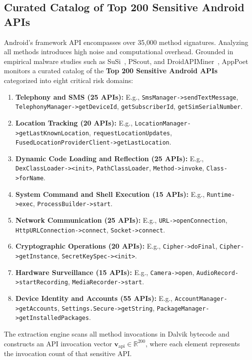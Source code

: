 \documentclass[12pt,a4paper,oneside]{report}
\begin{document}
\subsection{Curated Catalog of Top 200 Sensitive Android APIs}
Android's framework API encompasses over 35,000 method signatures. Analyzing all methods introduces high noise and computational overhead. Grounded in empirical malware studies such as SuSi~\cite{ref14}, PScout, and DroidAPIMiner~\cite{ref6}, AppPoet monitors a curated catalog of the \textbf{Top 200 Sensitive Android APIs} categorized into eight critical risk domains:
\begin{enumerate}
    \item \textbf{Telephony and SMS (25 APIs):} E.g., \texttt{SmsManager->sendTextMessage}, \texttt{TelephonyManager->getDeviceId}, \texttt{getSubscriberId}, \texttt{getSimSerialNumber}.
    \item \textbf{Location Tracking (20 APIs):} E.g., \texttt{LocationManager->getLastKnownLocation}, \texttt{requestLocationUpdates}, \texttt{FusedLocationProviderClient->getLastLocation}.
    \item \textbf{Dynamic Code Loading and Reflection (25 APIs):} E.g., \texttt{DexClassLoader-><init>}, \texttt{PathClassLoader}, \texttt{Method->invoke}, \texttt{Class->forName}.
    \item \textbf{System Command and Shell Execution (15 APIs):} E.g., \texttt{Runtime->exec}, \texttt{ProcessBuilder->start}.
    \item \textbf{Network Communication (25 APIs):} E.g., \texttt{URL->openConnection}, \texttt{HttpURLConnection->connect}, \texttt{Socket->connect}.
    \item \textbf{Cryptographic Operations (20 APIs):} E.g., \texttt{Cipher->doFinal}, \texttt{Cipher->getInstance}, \texttt{SecretKeySpec-><init>}.
    \item \textbf{Hardware Surveillance (15 APIs):} E.g., \texttt{Camera->open}, \texttt{AudioRecord->startRecording}, \texttt{MediaRecorder->start}.
    \item \textbf{Device Identity and Accounts (55 APIs):} E.g., \texttt{AccountManager->getAccounts}, \texttt{Settings.Secure->getString}, \texttt{PackageManager->getInstalledPackages}.
\end{enumerate}

The extraction engine scans all method invocations in Dalvik bytecode and constructs an API invocation vector $\mathbf{v}_{\text{api}} \in \mathbb{R}^{200}$, where each element represents the invocation count of that sensitive API.
\end{document}
